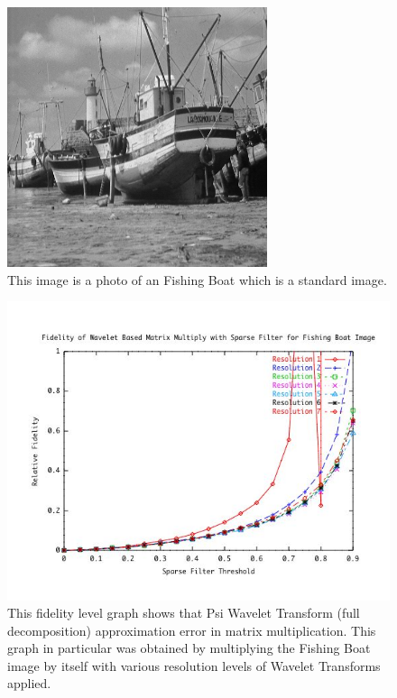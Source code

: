 \begin{figure}[ht]
\begin{center}\includegraphics [width=3in]{fishingboat.jpg}\end{center}
\caption{This image is a photo of an Fishing Boat  which is a standard image.}
\label{imagefishingboat}
\end{figure}



\begin{figure}[ht]
\begin{center}\includegraphics [width=5in]{fishingboatresultA.jpg}\end{center}
\caption{This fidelity level graph shows that Psi Wavelet Transform (full decomposition) approximation error in matrix multiplication.  This graph in particular was obtained by multiplying the Fishing Boat image by itself with various resolution levels of Wavelet Transforms applied.  }
\label{imagefishingboatFidelity}
\end{figure}


